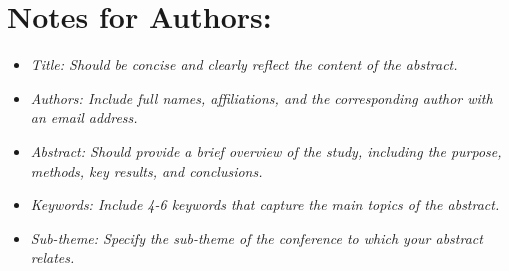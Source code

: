 \documentclass[11pt]{article}
\begin{document}
\section*{Notes for Authors:}
\begin{flushleft}
\begin{itemize}
    \item \textit{Title: Should be concise and clearly reflect the content of the abstract.}
    \item \textit{Authors: Include full names, affiliations, and the corresponding author with an email address.}
    \item \textit{Abstract: Should provide a brief overview of the study, including the purpose, methods, key results, and conclusions.}
    \item \textit{Keywords: Include 4-6 keywords that capture the main topics of the abstract.}
    \item \textit{Sub-theme: Specify the sub-theme of the conference to which your abstract relates.}
\end{itemize}
\end{flushleft}
\end{document}
